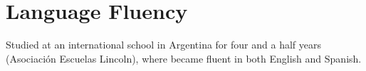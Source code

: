 \documentclass[letterpaper,11pt]{article}
\newcommand{\resumeSubHeadingListStart}{\begin{itemize}[leftmargin=*]}
\newcommand{\resumeSubHeadingListEnd}{\end{itemize}}
\begin{document}
\section{Language Fluency}
  \resumeSubHeadingListStart
    Studied at an international school in Argentina for four and a half years (Asociaci\'on Escuelas Lincoln), where became fluent in both English and Spanish.
  \resumeSubHeadingListEnd
\end{document}

